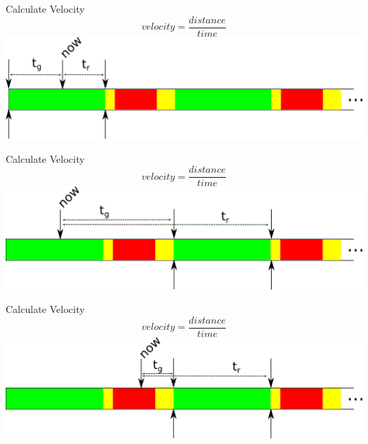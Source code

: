 \begin{frame}{Calculate Velocity}
\[velocity = \frac{distance}{time}\]
\includegraphics[width=1\textwidth]{images/algphases1.png}
\end{frame}

\begin{frame}{Calculate Velocity}
\[velocity = \frac{distance}{time}\]
\includegraphics[width=1\textwidth]{images/algphases2.png}
\end{frame}

\begin{frame}{Calculate Velocity}
\[velocity = \frac{distance}{time}\]
\includegraphics[width=1\textwidth]{images/algphases3.png}
\end{frame}







